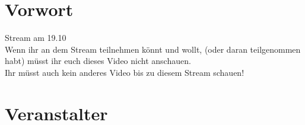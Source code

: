 

\usepackage{listings}
\usepackage{tikz}



\subtitle{Organisatorisches}
\maketitle

\section{Vorwort}
\begin{frame}
	\slidehead
	\begin{center}
		\vspace{1cm}
		{\Huge Stream am 19.10}\\
		\vspace{1cm}
		Wenn ihr an dem Stream teilnehmen könnt und wollt, (oder daran teilgenommen habt) müsst ihr euch dieses Video nicht anschauen.\\
		Ihr müsst auch kein anderes Video bis zu diesem Stream schauen!
	\end{center}
\end{frame}

\section{Veranstalter}
